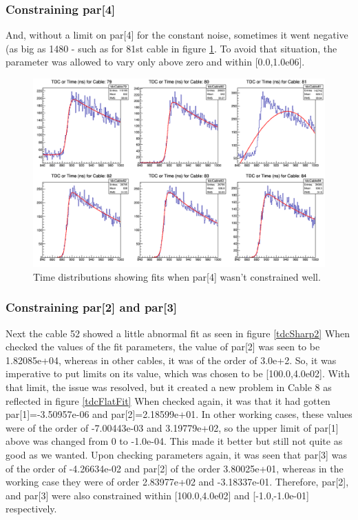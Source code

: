 \documentclass[12pt,epsfig]{article}
\begin{document}
\subsubsection{Constraining par[4]}
And, without a limit on par[4] for the constant noise, sometimes it went negative (as big 
as 1480 - such as for 81st cable in figure \ref{tdcNegNoise}.
To avoid that situation, the parameter was allowed to vary only above zero and within [0.0,1.0e06].

\begin{figure}
    \centering
    \includegraphics[width=1.0\textwidth]{Figures/tdcForRun068_Cables79to84.png}
    \caption{Time distributions showing fits when par[4] wasn't constrained well.}
    \label{tdcNegNoise}
\end{figure}


\subsubsection{Constraining par[2] and par[3]}

Next the cable 52 showed a little abnormal fit as seen in figure \ref{tdcSharp2}
When checked the values of the fit parameters, the value of par[2] was seen to be 1.82085e+04,
whereas in other cables, it was of the order of 3.0e+2. So, it was imperative to put 
limits on its value, which was chosen to be [100.0,4.0e02]. With that limit, the issue
was resolved, but it created a new problem in Cable 8 as reflected in figure \ref{tdcFlatFit}
When checked again, it was that it had gotten  par[1]=-3.50957e-06 and par[2]=2.18599e+01. 
In other working cases, these values were of the order of -7.00443e-03 and 3.19779e+02, so 
the upper limit of par[1] above was changed from 0 to -1.0e-04. This made it better but 
still not quite as good as we wanted. Upon checking parameters again, it was seen that par[3] 
was of the order of -4.26634e-02 and par[2] of the order 3.80025e+01, whereas in the working case 
they were of order 2.83977e+02 and  -3.18337e-01. Therefore, par[2], and par[3] were also 
constrained within [100.0,4.0e02] and [-1.0,-1.0e-01] respectively.
\end{document}
